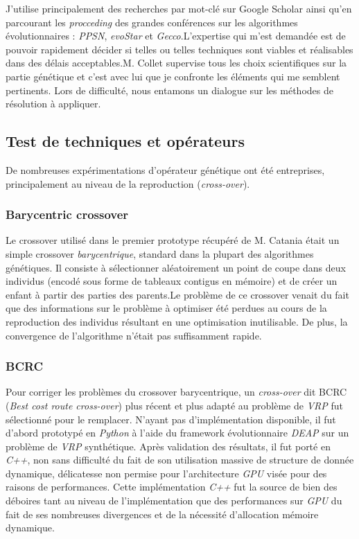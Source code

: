 \documentclass[french, 11pt]{memoir}
\begin{document}
J'utilise principalement des recherches par mot-clé sur Google Scholar
ainsi qu'en parcourant les \emph{procceding} des grandes conférences sur
les algorithmes évolutionnaires : \emph{PPSN}, \emph{evoStar} et
\emph{Gecco}.L'expertise qui m'est demandée est de pouvoir rapidement
décider si telles ou telles techniques sont viables et réalisables dans
des délais acceptables.M. Collet supervise tous les choix scientifiques
sur la partie génétique et c'est avec lui que je confronte les éléments
qui me semblent pertinents. Lors de difficulté, nous entamons un
dialogue sur les méthodes de résolution à appliquer.

\subsection{Test de techniques et
	opérateurs}\label{test-de-techniques-et-opuxe9rateurs}

De nombreuses expérimentations d'opérateur génétique ont été
entreprises, principalement au niveau de la reproduction
(\emph{cross-over}).

\subsubsection{Barycentric crossover}\label{barycentric-crossover}

Le crossover utilisé dans le premier prototype récupéré de M. Catania
était un simple crossover \emph{barycentrique}, standard dans la plupart
des algorithmes génétiques. Il consiste à sélectionner aléatoirement un
point de coupe dans deux individus (encodé sous forme de tableaux
contigus en mémoire) et de créer un enfant à partir des parties des
parents.Le problème de ce crossover venait du fait que des informations
sur le problème à optimiser été perdues au cours de la reproduction des
individus résultant en une optimisation inutilisable. De plus, la
convergence de l'algorithme n'était pas suffisamment rapide.

\subsubsection{BCRC}\label{bcrc}

Pour corriger les problèmes du crossover barycentrique, un
\emph{cross-over} dit BCRC (\emph{Best cost route cross-over}) plus
récent et plus adapté au problème de \textit{VRP} fut sélectionné pour le
remplacer. N'ayant pas d'implémentation disponible, il fut d'abord
prototypé en \textit{Python} à l'aide du framework évolutionnaire \emph{DEAP}
sur un problème de \emph{VRP} synthétique. Après validation des
résultats, il fut porté en \textit{C++}, non sans difficulté du fait de
	son utilisation massive de structure de donnée dynamique, délicatesse
	non permise pour l'architecture \textit{GPU} visée pour des raisons de
performances. Cette implémentation \emph{C++} fut la source de bien des
déboires tant au niveau de l'implémentation que des performances sur
\textit{GPU} du fait de ses nombreuses divergences et de la nécessité
d'allocation mémoire dynamique.
\end{document}
